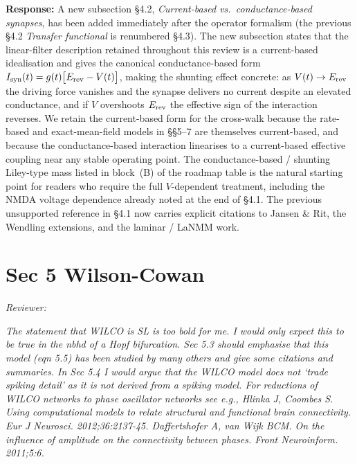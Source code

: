 \documentclass[12pt,a4paper]{article}
\newcommand{\reviewercomment}[1]{\par\smallskip\noindent\textit{Reviewer:}\par\smallskip\begingroup\itshape #1\par\endgroup\smallskip}
\newcommand{\ourresponse}[1]{\par\noindent\textbf{Response:} #1\par\medskip}
\begin{document}
\ourresponse{A new subsection §4.2, \emph{Current-based vs.\ conductance-based synapses}, has been added immediately after the operator formalism (the previous §4.2 \emph{Transfer functional} is renumbered §4.3). The new subsection states that the linear-filter description retained throughout this review is a current-based idealisation and gives the canonical conductance-based form $I_{\rm syn}(t)=g(t)\bigl[E_{\rm rev}-V(t)\bigr]$, making the shunting effect concrete: as $V(t)\to E_{\rm rev}$ the driving force vanishes and the synapse delivers no current despite an elevated conductance, and if $V$ overshoots $E_{\rm rev}$ the effective sign of the interaction reverses. We retain the current-based form for the cross-walk because the rate-based and exact-mean-field models in §§5--7 are themselves current-based, and because the conductance-based interaction linearises to a current-based effective coupling near any stable operating point. The conductance-based / shunting Liley-type mass listed in block~(B) of the roadmap table is the natural starting point for readers who require the full $V$-dependent treatment, including the NMDA voltage dependence already noted at the end of §4.1. The previous unsupported reference in §4.1 now carries explicit citations to Jansen \& Rit, the Wendling extensions, and the laminar / LaNMM work.}

\section*{Sec 5 Wilson-Cowan}

\reviewercomment{The statement that WILCO is SL is too bold for me. I would only expect this to be true in the nbhd of a Hopf bifurcation. Sec 5.3 should emphasise that this model (eqn 5.5) has been studied by many others and give some citations and summaries. In Sec 5.4 I would argue that the WILCO model does not `trade spiking detail' as it is not derived from a spiking model. For reductions of WILCO networks to phase oscillator networks see e.g., Hlinka J, Coombes S. Using computational models to relate structural and functional brain connectivity. Eur J Neurosci. 2012;36:2137-45. Daffertshofer A, van Wijk BCM. On the influence of amplitude on the connectivity between phases. Front Neuroinform. 2011;5:6.}
\end{document}
